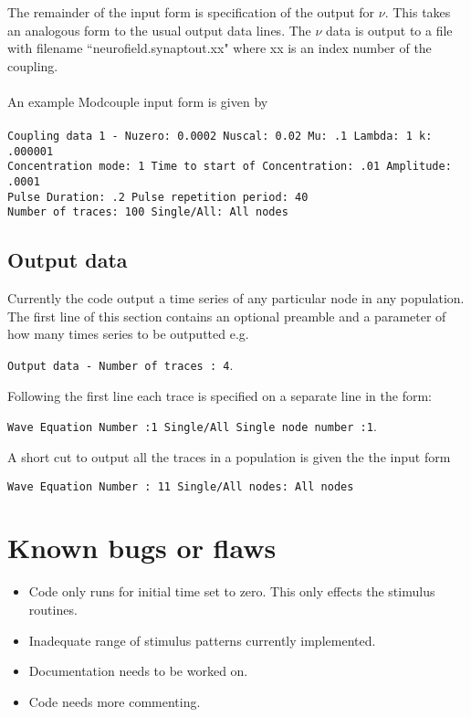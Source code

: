 \documentclass[12pt,a4paper]{article}
\begin{document}
The remainder of the input form is specification of the output for $\nu$.
This takes an analogous form to the usual output data lines. The $\nu$
data is output to a file with filename ``neurofield.synaptout.xx" where xx is an index number
of the coupling.
\\
\\
An example Modcouple input form is given by
\\
\\
{\tt \small Coupling data 1  - Nuzero: 0.0002 Nuscal: 0.02 Mu: .1 Lambda: 1 k: .000001 \\
 Concentration mode: 1  Time to start of Concentration: .01 Amplitude: .0001\\
 Pulse Duration: .2 Pulse repetition period: 40 \\
 Number of traces: 100  Single/All: All nodes}


\subsection{Output data}
Currently the code output a time series of any particular node in any population.
The first line of this section contains an optional preamble and a parameter
of how many times series to be outputted e.g.

{\tt \small Output data - Number of traces : 4}.

Following the first line
each trace is specified on a separate line in the form:

{\tt \small Wave Equation Number :1 Single/All Single node number :1}.

A short cut to output all the traces in a population is given the the
input form

{\tt \small Wave Equation Number : 11 Single/All nodes: All nodes}


\section{Known bugs or flaws} 

\begin{itemize}
    
\item Code only runs for initial time set to zero. This only effects the
stimulus routines.

\item Inadequate range of stimulus patterns currently implemented.

\item Documentation needs to be worked on.

\item Code needs more commenting.

\end{itemize}
\end{document}
